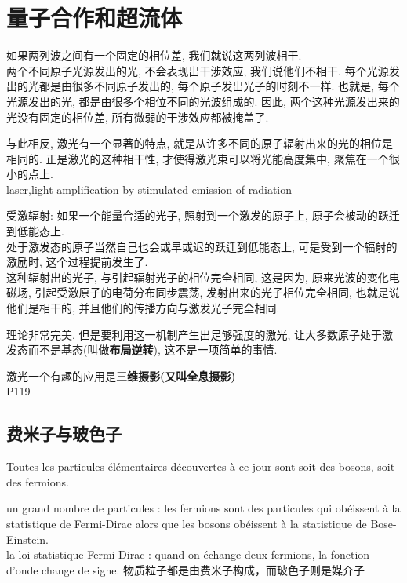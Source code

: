 \documentclass[openany]{book}
\begin{document}
\section{量子合作和超流体}
如果两列波之间有一个固定的相位差, 我们就说这两列波相干.\\
两个不同原子光源发出的光, 不会表现出干涉效应, 我们说他们不相干. 每个光源发出的光都是由很多不同原子发出的, 每个原子发出光子的时刻不一样. 
也就是, 每个光源发出的光, 都是由很多个相位不同的光波组成的. 因此, 两个这种光源发出来的光没有固定的相位差, 所有微弱的干涉效应都被掩盖了.

与此相反, 激光有一个显著的特点, 就是从许多不同的原子辐射出来的光的相位是相同的. 正是激光的这种相干性, 才使得激光束可以将光能高度集中, 聚焦在一个很小的点上.\\
laser,light amplification by stimulated emission of radiation

受激辐射: 如果一个能量合适的光子, 照射到一个激发的原子上, 原子会被动的跃迁到低能态上.\\
处于激发态的原子当然自己也会或早或迟的跃迁到低能态上, 可是受到一个辐射的激励时, 这个过程提前发生了.\\
这种辐射出的光子, 与引起辐射光子的相位完全相同, 
这是因为, 原来光波的变化电磁场, 引起受激原子的电荷分布同步震荡, 发射出来的光子相位完全相同, 也就是说他们是相干的, 并且他们的传播方向与激发光子完全相同.

理论非常完美, 但是要利用这一机制产生出足够强度的激光, 让大多数原子处于激发态而不是基态(叫做\textbf{布局逆转}), 这不是一项简单的事情.

激光一个有趣的应用是\textbf{三维摄影(又叫全息摄影)}\\
P119

\subsection{费米子与玻色子}
Toutes les particules \'el\'ementaires d\'ecouvertes \`a ce jour sont soit des bosons, soit des fermions.\par

un grand nombre de particules : les fermions sont des particules qui ob\'eissent \`a la statistique de Fermi-Dirac alors que les bosons ob\'eissent \`a la statistique de Bose-Einstein.\\
la loi statistique Fermi-Dirac : quand on \'echange deux fermions, la fonction d'onde change de signe.
物质粒子都是由费米子构成，而玻色子则是媒介子
\end{document}
